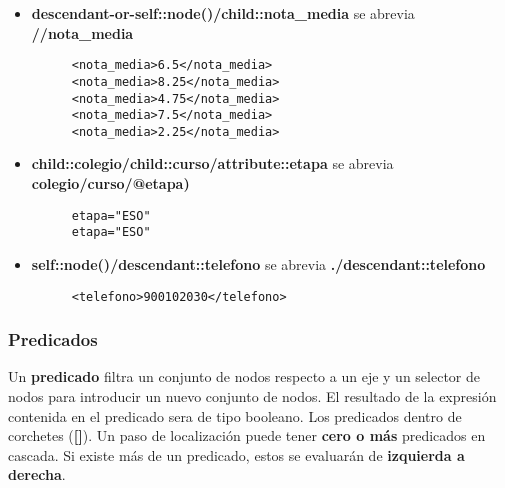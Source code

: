 \begin{itemize}
    \item \textbf{descendant-or-self::node()/child::nota\_media} se abrevia \textbf{//nota\_media}

    \begin{figure}[H]
        \begin{tcolorbox}[sharp corners, colback=yellow!30, colframe=white!20]
            \scriptsize
            \begin{verbatim}
<nota_media>6.5</nota_media>
<nota_media>8.25</nota_media>
<nota_media>4.75</nota_media>
<nota_media>7.5</nota_media>
<nota_media>2.25</nota_media>
            \end{verbatim}
        \end{tcolorbox}
    \end{figure}

    \item \textbf{child::colegio/child::curso/attribute::etapa} se abrevia \textbf{colegio/curso/@etapa)}
    \begin{figure}[H]
    \begin{tcolorbox}[sharp corners, colback=yellow!30, colframe=white!20]
        \scriptsize
        \begin{verbatim}
etapa="ESO"
etapa="ESO"
        \end{verbatim}
    \end{tcolorbox}
\end{figure}

    \item \textbf{self::node()/descendant::telefono} se abrevia \textbf{./descendant::telefono}
     \begin{figure}[H]
     \begin{tcolorbox}[sharp corners, colback=yellow!30, colframe=white!20]
         \scriptsize
         \begin{verbatim}
<telefono>900102030</telefono>
         \end{verbatim}
     \end{tcolorbox}
 \end{figure}
\end{itemize}

\subsubsection{Predicados}
Un \textbf{predicado} filtra un conjunto de nodos respecto a un eje y un selector de nodos para introducir un nuevo conjunto de nodos. El resultado de la expresión contenida en el predicado sera de tipo booleano. Los predicados dentro de corchetes (\textbf{[]}). Un paso de localización puede tener \textbf{cero o más} predicados en cascada. Si existe más de un predicado, estos se evaluarán de \textbf{izquierda a derecha}.

